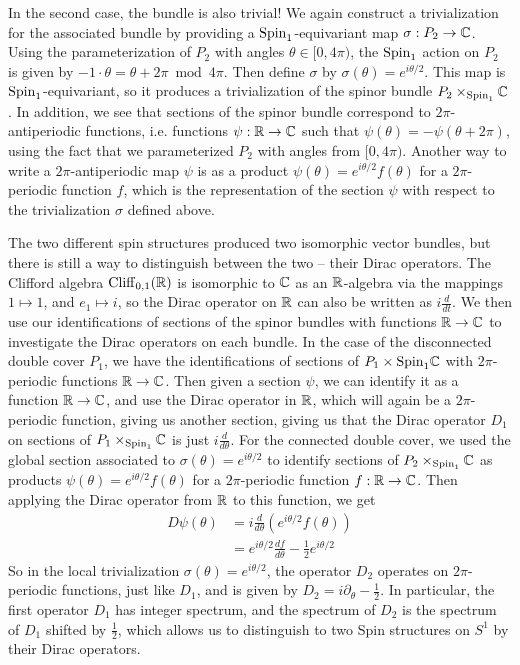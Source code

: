 \begin{exmp}
In the second case, the bundle is also trivial! We again construct a trivialization
for the associated bundle by providing a $\mathrm{Spin}_1$-equivariant map
$\sigma : P_2 \to \mathbb{C}$. Using the parameterization of $P_2$ with angles
$\theta \in [0,4\pi)$, the $\mathrm{Spin}_1$ action on $P_2$ is given by
$-1 \cdot \theta = \theta + 2\pi \bmod 4\pi$. Then define $\sigma$ by
$\sigma(\theta) = e^{i\theta/2}$. This map is $\mathrm{Spin}_1$-equivariant, so
it produces a trivialization of the spinor bundle $P_2 \times_{\mathrm{Spin}_1} \mathbb{C}$.
In addition, we see that sections of the spinor bundle correspond
to $2\pi$-antiperiodic functions, i.e. functions $\psi : \mathbb{R} \to \mathbb{C}$ such that
$\psi(\theta) = -\psi(\theta + 2\pi)$, using the fact that we parameterized $P_2$
with angles from $[0, 4\pi)$. Another way to write a $2\pi$-antiperiodic map
$\psi$ is as a product $\psi(\theta) = e^{i\theta/2}f(\theta)$ for a $2\pi$-periodic
function $f$, which is the representation of the section $\psi$ with respect to the
trivialization $\sigma$ defined above.

The two different spin structures produced two isomorphic vector bundles,
but there is still a way to distinguish between the two -- their Dirac operators.
The Clifford algebra $\operatorname{Cliff}_{0,1}(\mathbb{R})$ is isomorphic to $\mathbb{C}$ as an $\mathbb{R}$-algebra
via the mappings $1 \mapsto 1$, and $e_1 \mapsto i$, so the Dirac operator on
$\mathbb{R}$ can also be written as $i \frac{d}{dt}$. We then use our identifications
of sections of the spinor bundles with functions $\mathbb{R} \to \mathbb{C}$ to investigate the
Dirac operators on each bundle. In the case of the disconnected double cover $P_1$,
we have the identifications of sections of $P_1 \times{\mathrm{Spin}_1} \mathbb{C}$ with
$2\pi$-periodic functions $\mathbb{R} \to \mathbb{C}$. Then given a section $\psi$, we
can identify it as a function $\mathbb{R} \to \mathbb{C}$, and use the Dirac operator in $\mathbb{R}$,
which will again be a $2\pi$-periodic function, giving us another section,
giving us that the Dirac operator $D_1$ on sections of $P_1 \times_{\mathrm{Spin}_1} \mathbb{C}$
is just $i\frac{d}{d\theta}$. For the connected double cover, we used the
global section associated to $\sigma(\theta) = e^{i\theta /2}$ to identify
sections of $P_2 \times_{\mathrm{Spin}_1} \mathbb{C}$ as products
$\psi(\theta) = e^{i\theta/2}f(\theta)$ for a $2\pi$-periodic function $f : \mathbb{R} \to \mathbb{C}$.
Then applying the Dirac operator from $\mathbb{R}$ to this function, we get
%
\begin{align*}
D\psi(\theta) &= i\frac{d}{d\theta}\left( e^{i\theta/2}f(\theta) \right) \\
&= e^{i\theta/2}\frac{d f}{d \theta} - \frac{1}{2}e^{i\theta/2}
\end{align*}
%
So in the local trivialization $\sigma(\theta) = e^{i\theta/2}$, the operator $D_2$
operates on $2\pi$-periodic functions, just like $D_1$, and is given by
$D_2 = i\partial_\theta - \frac{1}{2}$. In particular, the first operator $D_1$ has
integer spectrum, and the spectrum of $D_2$ is the spectrum of $D_1$ shifted by
$\frac{1}{2}$, which allows us to distinguish to two Spin structures on $S^1$
by their Dirac operators.
%
\end{exmp}
